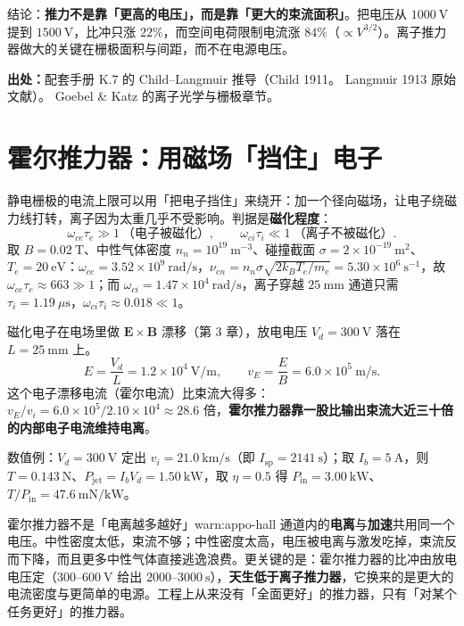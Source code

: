 结论：\textbf{推力不是靠「更高的电压」，而是靠「更大的束流面积」}。把电压从 $1000\ \mathrm{V}$ 提到 $1500\ \mathrm{V}$，比冲只涨 $22\%$，而空间电荷限制电流涨 $84\%$（$\propto V^{3/2}$）。离子推力器做大的关键在栅极面积与间距，而不在电源电压。

{\footnotesize
\textbf{出处：}配套手册 K.7 的 Child--Langmuir 推导（Child 1911。
Langmuir 1913 原始文献）。
Goebel \& Katz 的离子光学与栅极章节。
}


\section{霍尔推力器：用磁场「挡住」电子}

静电栅极的电流上限可以用「把电子挡住」来绕开：加一个径向磁场，让电子绕磁力线打转，离子因为太重几乎不受影响。判据是\textbf{磁化程度}：
\begin{equation}
\omega_{ce}\tau_e\gg1\ \text{（电子被磁化）},
\qquad
\omega_{ci}\tau_i\ll1\ \text{（离子不被磁化）}.
\label{eq:app-o-magnetized}
\end{equation}
取 $B=0.02\ \mathrm{T}$、中性气体密度 $n_n=10^{19}\ \mathrm{m^{-3}}$、碰撞截面 $\sigma=2\times10^{-19}\ \mathrm{m^2}$、$T_e=20\ \mathrm{eV}$：$\omega_{ce}=3.52\times10^{9}\ \mathrm{rad/s}$，$\nu_{en}=n_n\sigma\sqrt{2k_BT_e/m_e}=5.30\times10^{6}\ \mathrm{s^{-1}}$，故 $\omega_{ce}\tau_e\approx663\gg1$；而 $\omega_{ci}=1.47\times10^{4}\ \mathrm{rad/s}$，离子穿越 $25\ \mathrm{mm}$ 通道只需 $\tau_i=1.19\ \mu\mathrm{s}$，$\omega_{ci}\tau_i\approx0.018\ll1$。

磁化电子在电场里做 $\mathbf{E}\times\mathbf{B}$ 漂移（第 3 章），放电电压 $V_d=300\ \mathrm{V}$ 落在 $L=25\ \mathrm{mm}$ 上。
\begin{equation}
E=\frac{V_d}{L}=1.2\times10^{4}\ \mathrm{V/m},
\qquad
v_E=\frac{E}{B}=6.0\times10^{5}\ \mathrm{m/s}.
\label{eq:app-o-eb}
\end{equation}
这个电子漂移电流（霍尔电流）比束流大得多：$v_E/v_i=6.0\times10^{5}/2.10\times10^{4}\approx28.6$ 倍，\textbf{霍尔推力器靠一股比输出束流大近三十倍的内部电子电流维持电离}。

数值例：$V_d=300\ \mathrm{V}$ 定出 $v_i=21.0\ \mathrm{km/s}$（即 $I_{\mathrm{sp}}=2141\ \mathrm{s}$）；取 $I_b=5\ \mathrm{A}$，则 $T=0.143\ \mathrm{N}$、$P_{\mathrm{jet}}=I_bV_d=1.50\ \mathrm{kW}$，取 $\eta=0.5$ 得 $P_{\mathrm{in}}=3.00\ \mathrm{kW}$、$T/P_{\mathrm{in}}=47.6\ \mathrm{mN/kW}$。

\begin{warning}{霍尔推力器不是「电离越多越好」}{warn:appo-hall}
通道内的\textbf{电离}与\textbf{加速}共用同一个电压。中性密度太低，束流不够；中性密度太高，电压被电离与激发吃掉，束流反而下降，而且更多中性气体直接逃逸浪费。更关键的是：霍尔推力器的比冲由放电电压定（$300$--$600\ \mathrm{V}$ 给出 $2000$--$3000\ \mathrm{s}$），\textbf{天生低于离子推力器}，它换来的是更大的电流密度与更简单的电源。工程上从来没有「全面更好」的推力器，只有「对某个任务更好」的推力器。
\end{warning}

